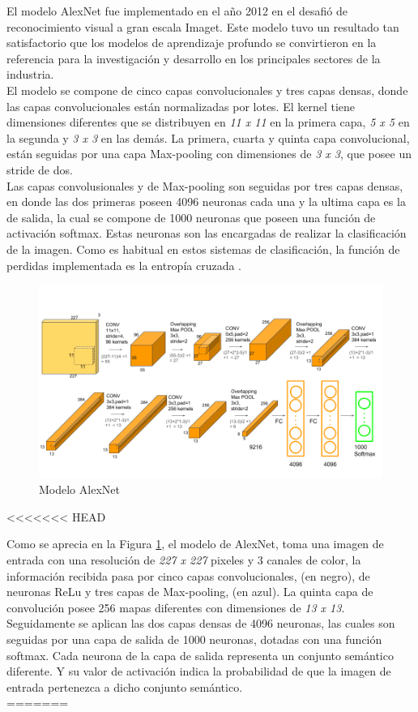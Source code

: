 				El modelo AlexNet fue implementado en el año 2012 en el desafió de reconocimiento visual a gran escala Imaget. Este modelo tuvo un resultado tan satisfactorio que los modelos de aprendizaje profundo se convirtieron en la referencia para la investigación y desarrollo en los principales sectores de la industria. \cite{Pytorch}\\
				
				
				El modelo se compone de cinco capas convolucionales y tres capas densas, donde las capas convolucionales están normalizadas por lotes. El kernel tiene dimensiones diferentes que se distribuyen en \textit{11 x 11} en la primera capa, \textit{5 x 5} en la segunda y \textit{3 x 3} en las demás. La primera, cuarta y quinta capa convolucional, están seguidas por una capa Max-pooling con dimensiones de \textit{3 x 3}, que posee un stride de dos.\\
				
				
				Las capas convolusionales y de Max-pooling son seguidas por tres capas densas, en donde las dos primeras poseen 4096 neuronas cada una y la ultima capa es la de salida, la cual se compone de 1000 neuronas que poseen una función de activación softmax. Estas neuronas son las encargadas de realizar la clasificación de la imagen. Como es habitual en estos sistemas de clasificación, la función de perdidas implementada es la entropía cruzada \cite{ref_1}.
				\\
				
				\begin{figure}[ht]
					\centering
					\includegraphics[scale=0.4]{Figs/5.png}
					\caption{Modelo AlexNet}
					\label{fig:AlexNet}
				\end{figure}
<<<<<<< HEAD
				
				Como se aprecia en la Figura \ref{fig:AlexNet}, el modelo de AlexNet, toma una imagen de entrada con una resolución de \textit{227 x 227} pixeles y 3 canales de color, la información recibida pasa por cinco capas convolucionales, (en negro), de neuronas ReLu y tres capas de Max-pooling, (en azul). La quinta capa de convolución posee 256 mapas diferentes con dimensiones de \textit{13 x 13}. Seguidamente se aplican las dos capas densas de 4096 neuronas, las cuales son seguidas por una capa de salida de 1000 neuronas, dotadas con una función softmax. Cada neurona de la capa de salida representa un conjunto semántico diferente. Y su valor de activación indica la probabilidad de que la imagen de entrada pertenezca a dicho conjunto semántico.\\
=======

